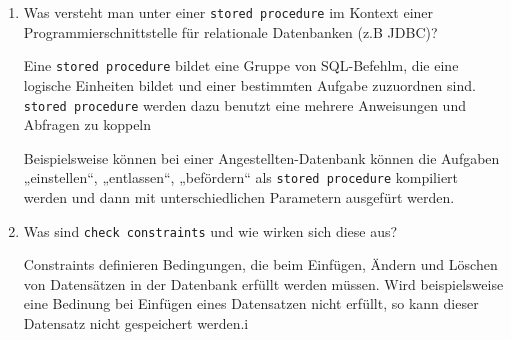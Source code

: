 \documentclass{lehramt-informatik-aufgabe}
\begin{document}
\begin{enumerate}

\item Was versteht man unter einer \texttt{stored procedure} im Kontext
einer Programmierschnittstelle für relationale Datenbanken (z.B JDBC)?

\begin{liAntwort}
Eine  \texttt{stored procedure} bildet eine Gruppe von SQL-Befehlm, die
eine logische Einheiten bildet und einer bestimmten Aufgabe zuzuordnen
sind.  \texttt{stored procedure} werden dazu benutzt eine mehrere
Anweisungen und Abfragen zu koppeln

Beispielsweise können bei einer Angestellten-Datenbank können die
Aufgaben „einstellen“, „entlassen“, „befördern“ als \texttt{stored
procedure} kompiliert werden und dann mit unterschiedlichen Parametern
ausgefürt werden.
\end{liAntwort}


\item Was sind \texttt{check constraints} und wie wirken sich diese aus?

\begin{liAntwort}
Constraints definieren Bedingungen, die beim Einfügen, Ändern und
Löschen von Datensätzen in der Datenbank erfüllt werden müssen. Wird
beispielsweise eine Bedinung bei Einfügen eines Datensatzen nicht
erfüllt, so kann dieser Datensatz nicht gespeichert werden.i
\end{liAntwort}

\end{enumerate}
\end{document}
